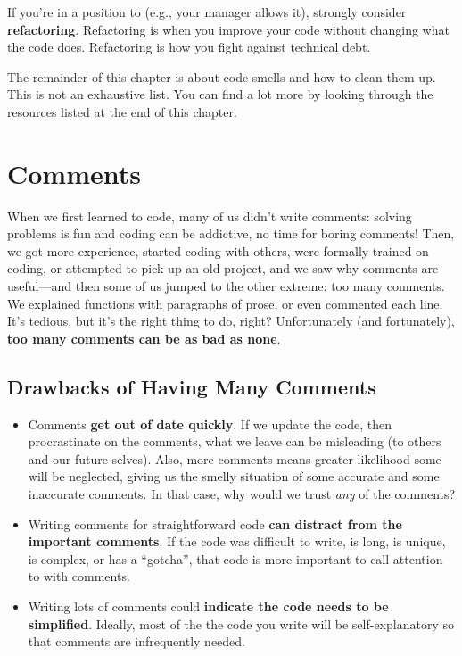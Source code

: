If you're in a position to (e.g., your manager allows it), strongly consider \textbf{refactoring}. Refactoring is when you improve your code without changing what the code does. Refactoring is how you fight against technical debt.\marginpar{\technicalDebtDef}

The remainder of this chapter is about code smells and how to clean them up. This is not an exhaustive list. You can find a lot more by looking through the resources listed at the end of this chapter.

\section{Comments}

When we first learned to code, many of us didn't write comments: solving problems is fun and coding can be addictive, no time for boring comments! Then, we got more experience, started coding with others, were formally trained on coding, or attempted to pick up an old project, and we saw why comments are useful---and then some of us jumped to the other extreme: too many comments. We explained functions with paragraphs of prose, or even commented each line. It's tedious, but it's the right thing to do, right? Unfortunately (and fortunately), \textbf{too many comments can be as bad as none}.

\subsection{Drawbacks of Having Many Comments}

\begin{itemize}
\item {Comments \textbf{get out of date quickly}. If we update the code, then procrastinate on the comments, what we leave can be misleading (to others and our future selves). Also, more comments means greater likelihood some will be neglected, giving us the smelly situation of some accurate and some inaccurate comments. In that case, why would we trust \textit{any} of the comments?\\}
\item{Writing comments for straightforward code \textbf{can distract from the important comments}. If the code was difficult to write, is long, is unique, is complex, or has a ``gotcha'', that code is more important to call attention to with comments.\\}
\item{Writing lots of comments could \textbf{indicate the code needs to be simplified}. Ideally, most of the the code you write will be self-explanatory so that comments are infrequently needed.}
\end{itemize}

